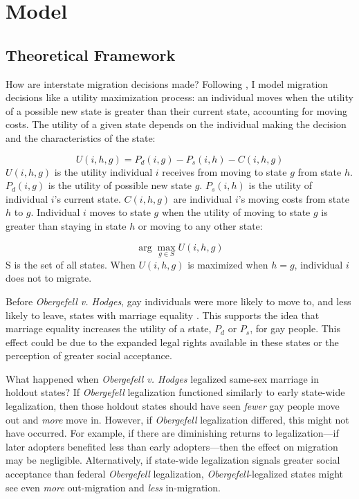 \documentclass[12pt,letterpaper]{article}
\begin{document}
\section{Model}
\subsection{Theoretical Framework}
How are interstate migration decisions made? Following \citet{12}, I model migration decisions like a utility maximization process: an individual moves when the utility of a possible new state is greater than their current state, accounting for moving costs. The utility of a given state depends on the individual making the decision and the characteristics of the state:

\begin{equation}
U(i, h, g) = P_d(i, g) - P_s(i, h) - C(i, h, g)
\end{equation}
$U(i, h, g)$ is the utility individual $i$ receives from moving to state $g$ from state $h$. $P_d(i, g)$ is the utility of possible new state $g$. $P_s(i, h)$ is the utility of individual $i$'s current state. $C(i, h, g)$ are individual $i$'s moving costs from state $h$ to $g$. Individual $i$ moves to state $g$ when the utility of moving to state $g$ is greater than staying in state $h$ or moving to any other state:

\begin{equation}
\arg\max_{g \in S} U(i, h, g)
\end{equation}
S is the set of all states. When $U(i, h, g)$ is maximized when $h = g$, individual $i$ does not to migrate.

\hfill
\break
Before \textit{Obergefell v. Hodges}, gay individuals were more likely to move to, and less likely to leave, states with marriage equality \citep{1, 12}. This supports the idea that marriage equality increases the utility of a state, $P_d$  or $P_s$, for gay people. This effect could be due to the expanded legal rights available in these states or the perception of greater social acceptance.

What happened when \textit{Obergefell v. Hodges} legalized same-sex marriage in holdout states? If \textit{Obergefell} legalization functioned similarly to early state-wide legalization, then those holdout states should have seen \textit{fewer} gay people move out and \textit{more} move in. However, if \textit{Obergefell} legalization differed, this might not have occurred. For example, if there are diminishing returns to legalization—if later adopters benefited less than early adopters—then the effect on migration may be negligible. Alternatively, if state-wide legalization signals greater social acceptance than federal \textit{Obergefell} legalization, \textit{Obergefell}-legalized states might see even \textit{more} out-migration and \textit{less} in-migration.
\end{document}
